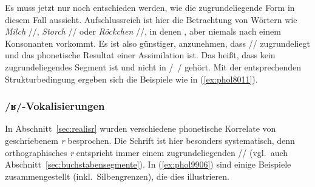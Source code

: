 Es muss jetzt nur noch entschieden werden, wie die zugrundeliegende Form in diesem Fall aussieht.
Aufschlussreich ist hier die Betrachtung von Wörtern wie \textit{Milch} //, \textit{Storch} // oder \textit{Röckchen} //, in denen \textipa{[\c{c}]}, aber niemals \textipa{[X]} nach einem Konsonanten vorkommt.
Es ist also günstiger, anzunehmen, dass // zugrundeliegt und \textipa{[X]} das phonetische Resultat einer Assimilation ist.
Das heißt, dass \textipa{[X]} kein zugrundeliegendes Segment ist und nicht in /~/ gehört.
Mit der entsprechenden Strukturbedingung ergeben sich die Beispiele wie in (\ref{ex:phol8011}).


\begin{exe}
  \ex\label{ex:phol8011}
  \begin{xlist}
  \end{xlist}
\end{exe}

\subsubsection{/ʁ/-Vokalisierungen}

\label{sec:prozrvok}

In Abschnitt~\ref{sec:realisr} wurden verschiedene phonetische Korrelate von geschriebenem \textit{r} besprochen.
Die Schrift ist hier besonders systematisch, denn orthographisches \textit{r} entspricht immer einem zugrundeliegenden // (vgl.\ auch Abschnitt~\ref{sec:buchstabensegmente}).
In (\ref{ex:phol9906}) sind einige Beispiele zusammengestellt (inkl.\ Silbengrenzen), die dies illustrieren.

\begin{exe}
  \ex\label{ex:phol9906}
  \begin{xlist}
  \end{xlist}
\end{exe}

